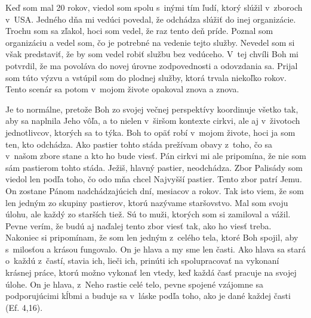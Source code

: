 \def\velkostpisma{9}
\def\velkostriadku{12}




Keď som mal 20 rokov, viedol som spolu s~inými tím ľudí, ktorý slúžil v~zboroch v~USA. Jedného dňa mi vedúci povedal, že odchádza slúžiť do inej organizácie. Trochu som sa zľakol, hoci som vedel, že raz tento deň príde. Poznal som organizáciu a vedel som, čo je potrebné na vedenie tejto služby. Nevedel som si však predstaviť, že by som vedel robiť službu bez vedúceho. V~tej chvíli Boh mi potvrdil, že ma povoláva do novej úrovne zodpovednosti a odovzdania sa. Prijal som túto výzvu a vstúpil som do plodnej služby, ktorá trvala niekoľko rokov. Tento scenár sa potom v~mojom živote opakoval znova a znova.

Je to normálne, pretože Boh zo svojej večnej perspektívy koordinuje všetko tak, aby sa naplnila Jeho vôľa, a to nielen v~širšom kontexte cirkvi, ale aj v~životoch jednotlivcov, ktorých sa to týka. Boh to opäť robí v~mojom živote, hoci ja som ten, kto odchádza.
Ako pastier tohto stáda prežívam obavy z~toho, čo sa v~našom zbore stane a kto ho bude viesť.
Pán cirkvi mi ale pripomína, že nie som sám pastierom tohto stáda. Ježiš, hlavný pastier, neodchádza. Zbor Palisády som viedol len podľa toho, čo odo mňa chcel Najvyšší pastier. Tento zbor patrí Jemu. On zostane Pánom nadchádzajúcich dní, mesiacov a rokov.
Tak isto viem, že som len jedným zo skupiny pastierov, ktorú nazývame staršovstvo. Mal som svoju úlohu, ale každý zo starších tiež. Sú to muži, ktorých som si zamiloval a vážil. Pevne verím, že budú aj naďalej tento zbor viesť tak, ako ho viesť treba. Nakoniec si pripomínam, že som len jedným z~celého tela, ktoré Boh spojil, aby s~milosťou a krásou fungovalo. On je hlava a my sme len časti. Ako hlava sa stará o~každú z~častí, stavia ich, lieči ich, prinúti ich spolupracovať na vykonaní krásnej práce, ktorú možno vykonať len vtedy, keď každá časť pracuje na svojej úlohe. On je hlava, z~Neho rastie celé telo, pevne spojené vzájomne sa podporujúcimi kĺbmi a buduje sa v~láske podľa toho, ako je dané každej časti (Ef. 4,16).

